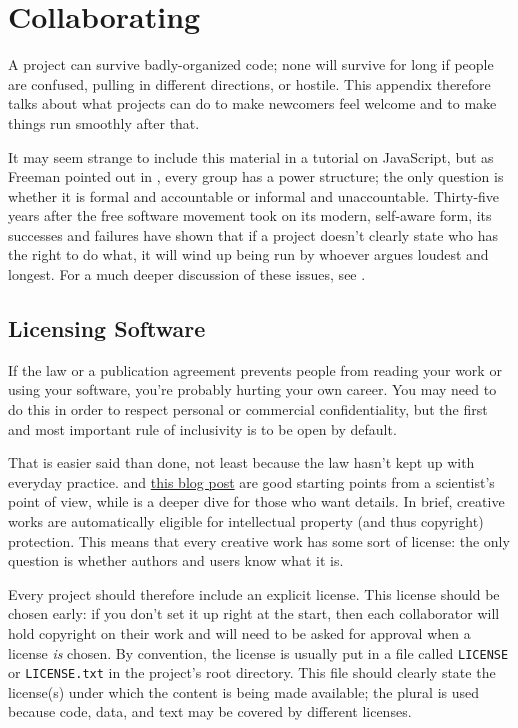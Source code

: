 \chapter{Collaborating}\label{s:collab}

A project can survive badly-organized code;
none will survive for long if people are confused,
pulling in different directions,
or hostile.
This appendix therefore talks about what projects can do to make newcomers feel welcome
and to make things run smoothly after that.

It may seem strange to include this material in a tutorial on JavaScript,
but as Freeman pointed out in \cite{Free1972},
every group has a power structure;
the only question is whether it is formal and accountable
or informal and unaccountable.
Thirty-five years after the free software movement took on its modern, self-aware form,
its successes and failures have shown that if a project doesn't clearly state
who has the right to do what,
it will wind up being run by whoever argues loudest and longest.
For a much deeper discussion of these issues,
see \cite{Foge2005}.

\section{Licensing Software}\label{s:collab-software}

If the law or a publication agreement prevents people from reading your work or using your software,
you're probably hurting your own career.
You may need to do this in order to respect personal or commercial confidentiality,
but the first and most important rule of inclusivity
is to be open by default.

That is easier said than done,
not least because the law hasn't kept up with everyday practice.
\cite{Mori2012} and \href{http://www.astrobetter.com/blog/2014/03/10/the-whys-and-hows-of-licensing-scientific-code/}{this blog post} are good starting points from a scientist's point of view,
while \cite{Lind2008} is a deeper dive for those who want details.
In brief,
creative works are automatically eligible for intellectual property (and thus copyright) protection.
This means that every creative work has some sort of license:
the only question is whether authors and users know what it is.

Every project should therefore include an explicit license.
This license should be chosen early:
if you don't set it up right at the start,
then each collaborator will hold copyright on their work
and will need to be asked for approval when a license \emph{is} chosen.
By convention,
the license is usually put in a file called \texttt{LICENSE} or \texttt{LICENSE.txt} in the project's root directory.
This file should clearly state the license(s) under which the content is being made available;
the plural is used because code, data, and text may be covered by different licenses.

